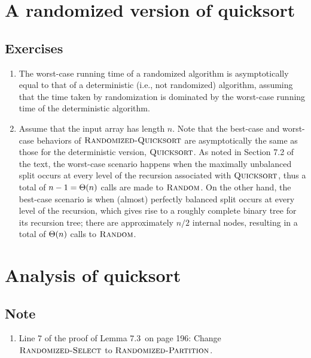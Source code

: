 \section{A randomized version of quicksort}
\subsection*{Exercises}
\begin{enumerate}[\thesection-1]
%
\item The worst-case running time of a randomized algorithm is asymptotically equal to that of a deterministic (i.e., not randomized) algorithm, assuming that the time taken by randomization is dominated by the worst-case running time of the deterministic algorithm.
%
\item Assume that the input array has length $n$. Note that the best-case and worst-case behaviors of $\textnormal{\scshape Randomized-Quicksort}$ are asymptotically the same as those for the deterministic version, $\textnormal{\scshape Quicksort}$. As noted in Section 7.2 of the text, the worst-case scenario happens when the maximally unbalanced split occurs at every level of the recursion associated with $\textnormal{\scshape Quicksort}$, thus a total of $n - 1 = \Theta\!\left(n\right)$ calls are made to $\textnormal{\scshape Random}$. On the other hand, the best-case scenario is when (almost) perfectly balanced split occurs at every level of the recursion, which gives rise to a roughly complete binary tree for its recursion tree; there are approximately $n / 2$ internal nodes, resulting in a total of $\Theta\!\left(n\right)$ calls to $\textnormal{\scshape Random}$.
%
\end{enumerate}


\section{Analysis of quicksort}
\subsection*{Note}
\begin{enumerate}
%
\item Line 7 of the proof of Lemma 7.3~on page 196: Change $\textnormal{\scshape Randomized-Select}$ to $\textnormal{\scshape Randomized-Partition}$.
%
\end{enumerate}
